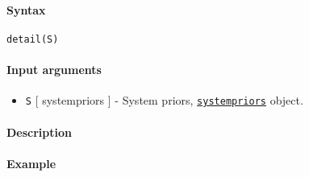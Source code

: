 


	\paragraph{Syntax}

\begin{verbatim}
detail(S)
\end{verbatim}

\paragraph{Input arguments}

\begin{itemize}
\itemsep1pt\parskip0pt
\item
  \texttt{S} {[} systempriors {]} - System priors,
  \href{systempriors/Contents}{\texttt{systempriors}} object.
\end{itemize}

\paragraph{Description}

\paragraph{Example}


